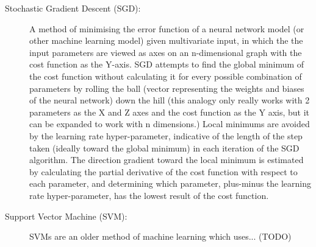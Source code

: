 \documentclass[]{report}
\begin{document}
\begin{description}
\label{itm:SGD}
\item[Stochastic Gradient Descent (SGD):] A method of minimising the error function of a neural network model (or other machine learning model) given multivariate input, in which the the input parameters are viewed as axes on an n-dimensional graph with the cost function as the Y-axis. SGD attempts to find the global minimum of the cost function without calculating it for every possible combination of parameters by rolling the ball (vector representing the weights and biases of the neural network) down the hill (this analogy only really works with 2 parameters as the X and Z axes and the cost function as the Y axis, but it can be expanded to work with n dimensions.) Local minimums are avoided by the learning rate hyper-parameter, indicative of the length of the step taken (ideally toward the global minimum) in each iteration of the SGD algorithm. The direction gradient toward the local minimum is estimated by calculating the partial derivative of the cost function with respect to each parameter, and determining which parameter, plus-minus the learning rate hyper-parameter, has the lowest result of the cost function.

\item[Support Vector Machine (SVM):] SVMs are an older method of machine learning which uses... (TODO)
\end{description}
\end{document}
